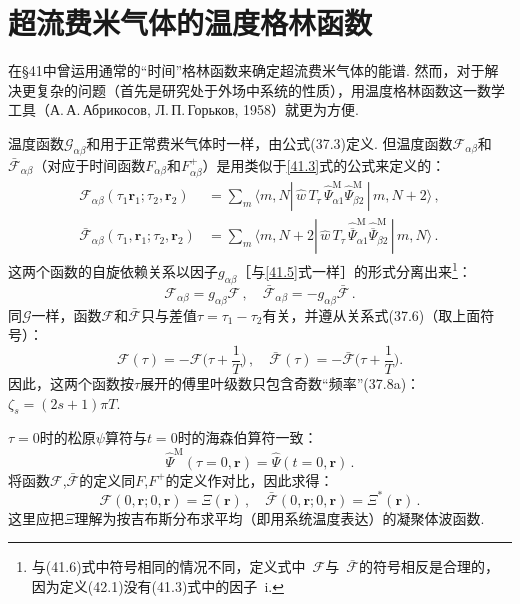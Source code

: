 \section{超流费米气体的温度格林函数}

在§41中曾运用通常的“时间”格林函数来确定超流费米气体的能谱. 然而，对于解决更复杂的问题（首先是研究处于外场中系统的性质），用温度格林函数这一数学工具（А.\,А.\,Абрикосов, Л.\,П.\,Горьков, 1958）就更为方便.

温度函数$\mathcal G_{\alpha\beta}$和用于正常费米气体时一样，由公式(37.3)定义. 但温度函数$\mathcal F_{\alpha\beta}$和$\bar{\mathcal F}_{\alpha\beta}$（对应于时间函数$F_{\alpha\beta}$和$F^{+}_{\alpha\beta}$）是用类似于\eqref{41.3}式的公式来定义的：
\begin{equation}
\begin{aligned}
\mathcal F_{\alpha\beta}(\tau_1\bm r_1;\tau_2,\bm r_2)
&= \sum_m\langle m,N|\,\hat w\,T_\tau\,\hat\Psi^{\mathrm M}_{\alpha1}\hat\Psi^{\mathrm M}_{\beta2}\,|\,m,N+2\rangle\,,\\
\bar{\mathcal F}_{\alpha\beta}(\tau_1,\bm r_1;\tau_2,\bm r_2)
&= \sum_m\langle m,N+2|\,\hat w\,T_\tau\,\hat{\overline\Psi}^{\mathrm M}_{\alpha1}\hat{\overline\Psi}^{\mathrm M}_{\beta2}\,|\,m,N\rangle\,.
\end{aligned}
\label{42.1}
\end{equation}
这两个函数的自旋依赖关系以因子$g_{\alpha\beta}$［与\eqref{41.5}式一样］的形式分离出来\footnote{与(41.6)式中符号相同的情况不同，定义式中~$\mathcal F$与~$\bar{\mathcal F}$的符号相反是合理的，因为定义(42.1)没有(41.3)式中的因子~$\mathrm i$.}：
\begin{equation}
\mathcal F_{\alpha\beta} = g_{\alpha\beta}\mathcal F\,,\quad \bar{\mathcal F}_{\alpha\beta} = -g_{\alpha\beta}\bar{\mathcal F}\,.
\label{42.2}
\end{equation}
同$\mathcal G$一样，函数$\mathcal F$和$\bar{\mathcal F}$只与差值$\tau=\tau_1-\tau_2$有关，并遵从关系式(37.6)（取上面符号）：
\begin{equation}
\mathcal F(\tau) = -\mathcal F\Biggl(\tau+\frac{1}{T}\Biggr)\,,\quad
\bar{\mathcal F}(\tau) = -\bar{\mathcal F}\Biggl(\tau+\frac{1}{T}\Biggr).
\label{42.3}
\end{equation}
因此，这两个函数按$\tau$展开的傅里叶级数只包含奇数“频率”(37.8a)：$\zeta_s=(2s+1)\pi T$.

$\tau=0$时的松原$\psi$算符与$t=0$时的海森伯算符一致：
\begin{equation*}
\hat\Psi^{\mathrm M}(\tau=0,\bm r) = \hat\Psi(t=0,\bm r)\,.
\end{equation*}
将函数$\mathcal F$,$\bar{\mathcal F}$的定义同$F$,$F^{+}$的定义作对比，因此求得：
\begin{equation}
\mathcal F(0,\bm r;0,\bm r) = \Xi(\bm r)\,,\quad \bar{\mathcal F}(0,\bm r;0,\bm r) = \Xi^{*}(\bm r)\,.
\label{42.4}
\end{equation}
这里应把$\Xi$理解为按吉布斯分布求平均（即用系统温度表达）的凝聚体波函数.

